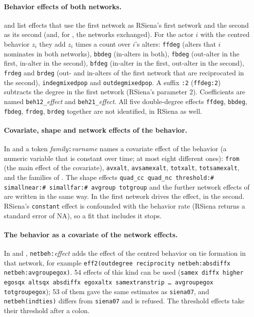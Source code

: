 \paragraph{Behavior effects of both networks.}  and  list effects that use the first network as RSiena's first network and the second as its second (and, for , the networks exchanged). For the actor $i$ with the centred behavior $z_i$ they add $z_i$ times a count over $i$'s alters: \texttt{ffdeg} (alters that $i$ nominates in both networks), \texttt{bbdeg} (in-alters in both), \texttt{fbdeg} (out-alter in the first, in-alter in the second), \texttt{bfdeg} (in-alter in the first, out-alter in the second), \texttt{frdeg} and \texttt{brdeg} (out- and in-alters of the first network that are reciprocated in the second), \texttt{indegmixedpop} and \texttt{outdegmixedpop}. A suffix \texttt{:2} (\texttt{ffdeg:2}) subtracts the degree in the first network (RSiena's parameter 2). Coefficients are named \texttt{beh12\_}\emph{effect} and \texttt{beh21\_}\emph{effect}. All five double-degree effects \texttt{ffdeg}, \texttt{bbdeg}, \texttt{fbdeg}, \texttt{frdeg}, \texttt{brdeg} together are not identified, in RSiena as well.

\paragraph{Covariate, shape and network effects of the behavior.} In  and  a token \emph{family}\texttt{:}\emph{varname} names a covariate effect of the behavior (a numeric variable that is constant over time; at most eight different ones): \texttt{from} (the main effect of the covariate), \texttt{avxalt}, \texttt{avsamexalt}, \texttt{totxalt}, \texttt{totsamexalt}, and the families of . The shape effects \texttt{quad\_cc quad\_nc threshold:\#  simallnear:\# simallfar:\# avgroup totgroup} and the further network effects of  are written in the same way. In  the first network drives the effect, in  the second. RSiena's \texttt{constant} effect is confounded with the behavior rate (RSiena returns a standard error of NA), so a fit that includes it stops.

\paragraph{The behavior as a covariate of the network effects.} In  and , \texttt{netbeh:}\emph{effect} adds the effect of the centred behavior on tie formation in that network, for example \texttt{eff2(outdegree reciprocity netbeh:absdiffx netbeh:avgroupegox)}. 54 effects of this kind can be used (\texttt{samex diffx higher egosqx altsqx absdiffx egoxaltx samextranstrip \ldots{} avgroupegox totgroupegox}); 53 of them gave the same estimates as \texttt{siena07}, and \texttt{netbeh(indties)} differs from \texttt{siena07} and is refused. The threshold effects take their threshold after a colon.

